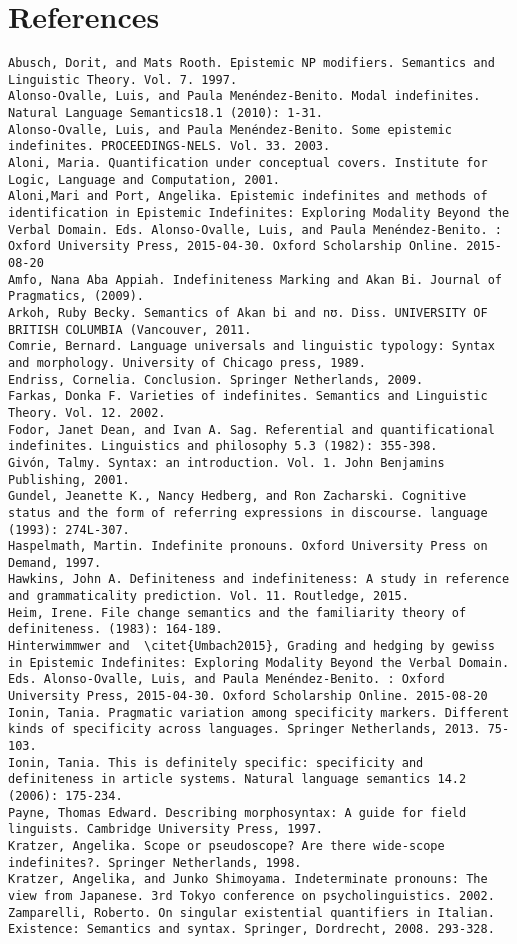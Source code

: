 \documentclass[output=paper,modfonts,nonflat,draftmode]{langsci/langscibook}
\begin{document}
\section*{References}
\begin{verbatim}
Abusch, Dorit, and Mats Rooth. Epistemic NP modifiers. Semantics and Linguistic Theory. Vol. 7. 1997.
Alonso-Ovalle, Luis, and Paula Menéndez-Benito. Modal indefinites. Natural Language Semantics18.1 (2010): 1-31.
Alonso-Ovalle, Luis, and Paula Menéndez-Benito. Some epistemic indefinites. PROCEEDINGS-NELS. Vol. 33. 2003.
Aloni, Maria. Quantification under conceptual covers. Institute for Logic, Language and Computation, 2001.
Aloni,Mari and Port, Angelika. Epistemic indefinites and methods of identification in Epistemic Indefinites: Exploring Modality Beyond the Verbal Domain. Eds. Alonso-Ovalle, Luis, and Paula Menéndez-Benito. : Oxford University Press, 2015-04-30. Oxford Scholarship Online. 2015-08-20
Amfo, Nana Aba Appiah. Indefiniteness Marking and Akan Bi. Journal of Pragmatics, (2009).
Arkoh, Ruby Becky. Semantics of Akan bi and nʊ. Diss. UNIVERSITY OF BRITISH COLUMBIA (Vancouver, 2011.
Comrie, Bernard. Language universals and linguistic typology: Syntax and morphology. University of Chicago press, 1989.
Endriss, Cornelia. Conclusion. Springer Netherlands, 2009.
Farkas, Donka F. Varieties of indefinites. Semantics and Linguistic Theory. Vol. 12. 2002.
Fodor, Janet Dean, and Ivan A. Sag. Referential and quantificational indefinites. Linguistics and philosophy 5.3 (1982): 355-398.
Givón, Talmy. Syntax: an introduction. Vol. 1. John Benjamins Publishing, 2001.
Gundel, Jeanette K., Nancy Hedberg, and Ron Zacharski. Cognitive status and the form of referring expressions in discourse. language (1993): 274L-307. 
Haspelmath, Martin. Indefinite pronouns. Oxford University Press on Demand, 1997.
Hawkins, John A. Definiteness and indefiniteness: A study in reference and grammaticality prediction. Vol. 11. Routledge, 2015.
Heim, Irene. File change semantics and the familiarity theory of definiteness. (1983): 164-189.
Hinterwimmwer and  \citet{Umbach2015}, Grading and hedging by gewiss in Epistemic Indefinites: Exploring Modality Beyond the Verbal Domain. Eds. Alonso-Ovalle, Luis, and Paula Menéndez-Benito. : Oxford University Press, 2015-04-30. Oxford Scholarship Online. 2015-08-20
Ionin, Tania. Pragmatic variation among specificity markers. Different kinds of specificity across languages. Springer Netherlands, 2013. 75-103.
Ionin, Tania. This is definitely specific: specificity and definiteness in article systems. Natural language semantics 14.2 (2006): 175-234.
Payne, Thomas Edward. Describing morphosyntax: A guide for field linguists. Cambridge University Press, 1997.
Kratzer, Angelika. Scope or pseudoscope? Are there wide-scope indefinites?. Springer Netherlands, 1998.
Kratzer, Angelika, and Junko Shimoyama. Indeterminate pronouns: The view from Japanese. 3rd Tokyo conference on psycholinguistics. 2002.
Zamparelli, Roberto. On singular existential quantifiers in Italian. Existence: Semantics and syntax. Springer, Dordrecht, 2008. 293-328. 
\end{verbatim}




\sloppy
\printbibliography[heading=subbibliography,notkeyword=this]
\end{document}

